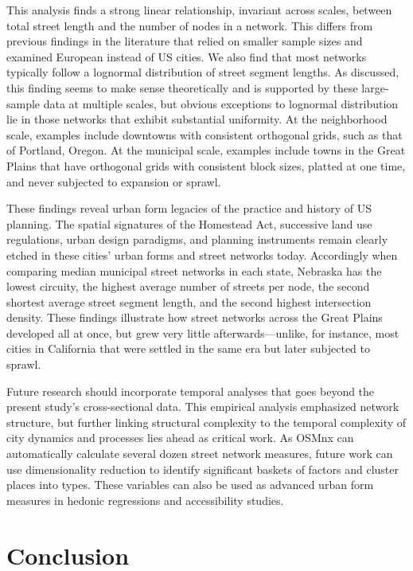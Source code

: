 \documentclass{article}
\begin{document}
This analysis finds a strong linear relationship, invariant across scales, between total street length and the number of nodes in a network. This differs from previous findings in the literature that relied on smaller sample sizes and examined European instead of US cities. We also find that most networks typically follow a lognormal distribution of street segment lengths. As discussed, this finding seems to make sense theoretically and is supported by these large-sample data at multiple scales, but obvious exceptions to lognormal distribution lie in those networks that exhibit substantial uniformity. At the neighborhood scale, examples include downtowns with consistent orthogonal grids, such as that of Portland, Oregon. At the municipal scale, examples include towns in the Great Plains that have orthogonal grids with consistent block sizes, platted at one time, and never subjected to expansion or sprawl.

These findings reveal urban form legacies of the practice and history of US planning. The spatial signatures of the Homestead Act, successive land use regulations, urban design paradigms, and planning instruments remain clearly etched in these cities' urban forms and street networks today. Accordingly when comparing median municipal street networks in each state, Nebraska has the lowest circuity, the highest average number of streets per node, the second shortest average street segment length, and the second highest intersection density. These findings illustrate how street networks across the Great Plains developed all at once, but grew very little afterwards---unlike, for instance, most cities in California that were settled in the same era but later subjected to sprawl.

Future research should incorporate temporal analyses that goes beyond the present study's cross-sectional data. This empirical analysis emphasized network structure, but further linking structural complexity to the temporal complexity of city dynamics and processes lies ahead as critical work. As OSMnx can automatically calculate several dozen street network measures, future work can use dimensionality reduction to identify significant baskets of factors and cluster places into types. These variables can also be used as advanced urban form measures in hedonic regressions and accessibility studies.

\section{Conclusion}
\end{document}
